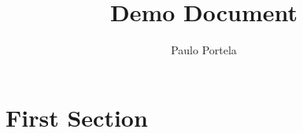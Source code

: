 \documentclass{article}
\begin{document}
	\title{Demo Document}  %
	\author{Paulo Portela}  %
	\maketitle  %
	\thispagestyle{empty}  %
	\newpage
	
	\setcounter{page}{1}  %
	
	\tableofcontents
	\newpage
	
	\setcounter{page}{1}  %
	
	\section{First Section}
	
	
\end{document}

